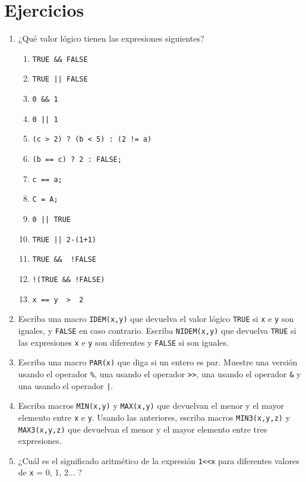 \section{Ejercicios}
\label{tc-operadores-ej}
\begin{enumerate}
\item ¿Qué valor lógico tienen las expresiones siguientes?
\begin{enumerate}[label=\alph*.]
	\item \lstinline{TRUE && FALSE}
	\item \lstinline{TRUE || FALSE}
	\item \lstinline{0 && 1}
	\item \lstinline{0 || 1}
	\item \lstinline{(c > 2) ? (b < 5) : (2 != a)}
	\item \lstinline{(b == c) ? 2 : FALSE;}
	\item \lstinline{c == a;}
	\item \lstinline{C = A;}
	\item \lstinline{0 || TRUE}
	\item \lstinline{TRUE || 2-(1+1)}
	\item \lstinline{TRUE &&  !FALSE}
	\item \lstinline{!(TRUE && !FALSE)}
	\item \lstinline{x == y  >  2}
\end{enumerate}
\item Escriba una macro \lstinline{IDEM(x,y)} que devuelva el valor lógico \lstinline{TRUE} si \lstinline{x} e \lstinline{y} son iguales, y \lstinline{FALSE} en caso contrario. Escriba \lstinline{NIDEM(x,y)} que devuelva \lstinline{TRUE} si las expresiones \lstinline{x} e \lstinline{y} son diferentes y \lstinline{FALSE} si son iguales.

\item Escriba una macro \lstinline{PAR(x)} que diga si un entero es par. Muestre una versión usando el operador \lstinline{%}, una usando el operador \lstinline{>>}, una usando el operador \lstinline{&} y una usando el operador \lstinline{|}.

\item  Escriba macros \lstinline{MIN(x,y)} y \lstinline{MAX(x,y)} que devuelvan el menor y el mayor elemento entre \lstinline{x} e \lstinline{y}. Usando las anteriores, escriba macros \lstinline{MIN3(x,y,z)} y \lstinline{MAX3(x,y,z)} que devuelvan el menor y el mayor elemento entre tres expresiones.

\item ¿Cuál es el significado aritmético de la expresión \lstinline{1<<x} para diferentes valores de \lstinline{x} = 0, 1, 2... ?


\end{enumerate}
